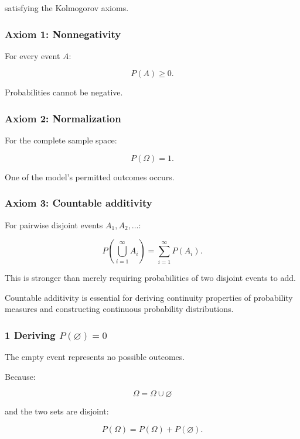 satisfying the Kolmogorov axioms.

\subsubsection{Axiom 1: Nonnegativity}\label{02-foundations-ii-ch023-axiom-1-nonnegativity}

For every event \(A\):

\[
 \boxed{P(A)\ge0}.
\]

Probabilities cannot be negative.

\subsubsection{Axiom 2: Normalization}\label{02-foundations-ii-ch023-axiom-2-normalization}

For the complete sample space:

\[
 \boxed{P(\Omega)=1}.
\]

One of the model's permitted outcomes occurs.

\subsubsection{Axiom 3: Countable additivity}\label{02-foundations-ii-ch023-axiom-3-countable-additivity}

For pairwise disjoint events \(A_1,A_2,\ldots\):

\[
 \boxed{ P\left(\bigcup_{i=1}^{\infty}A_i\right) = \sum_{i=1}^{\infty}P(A_i) }.
\]

This is stronger than merely requiring probabilities of two disjoint events to add.

Countable additivity is essential for deriving continuity properties of probability measures and constructing continuous probability distributions.

\subsubsection{\texorpdfstring{1 Deriving \(P(\varnothing)=0\)}{1 Deriving P(\textbackslash varnothing)=0}}\label{02-foundations-ii-ch023-deriving-pvarnothing0}

The empty event represents no possible outcomes.

Because:

\[
 \Omega=\Omega\cup\varnothing
\]

and the two sets are disjoint:

\[
 P(\Omega)=P(\Omega)+P(\varnothing).
\]

